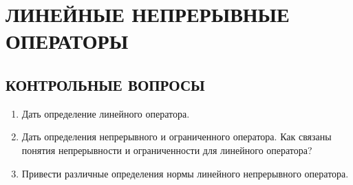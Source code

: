 \documentclass[12pt,a4paper]{article}
\begin{document}
\section{ЛИНЕЙНЫЕ НЕПРЕРЫВНЫЕ ОПЕРАТОРЫ}

\subsection*{КОНТРОЛЬНЫЕ ВОПРОСЫ}
\begin{enumerate}
\item Дать определение линейного оператора.
\item Дать определения непрерывного и ограниченного оператора. Как связаны понятия непрерывности и ограниченности для линейного оператора?
\item Привести различные определения нормы линейного непрерывного оператора.
\end{enumerate}
\end{document}
